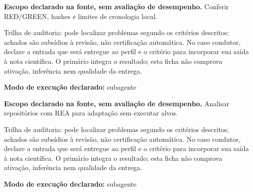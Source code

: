 
\begin{descricao}
\textbf{Escopo declarado na fonte, sem avaliação de desempenho.}
Conferir RED/GREEN, hashes e limites de cronologia local.
\end{descricao}

\begin{funcao}
Trilha de auditoria: pode localizar problemas segundo os critérios descritos; achados são subsídios à revisão, não certificação automática. No caso condutor, declare a entrada que será entregue ao perfil e o critério para incorporar sua saída à nota científica. O primário integra o resultado; esta ficha não comprova ativação, inferência nem qualidade da entrega.
\end{funcao}

\begin{arquitetura}
\textbf{Modo de execução declarado:} subagente
\end{arquitetura}


\begin{descricao}
\textbf{Escopo declarado na fonte, sem avaliação de desempenho.}
Analisar repositórios com REA para adaptação sem executar alvos.
\end{descricao}

\begin{funcao}
Trilha de auditoria: pode localizar problemas segundo os critérios descritos; achados são subsídios à revisão, não certificação automática. No caso condutor, declare a entrada que será entregue ao perfil e o critério para incorporar sua saída à nota científica. O primário integra o resultado; esta ficha não comprova ativação, inferência nem qualidade da entrega.
\end{funcao}

\begin{arquitetura}
\textbf{Modo de execução declarado:} subagente
\end{arquitetura}



